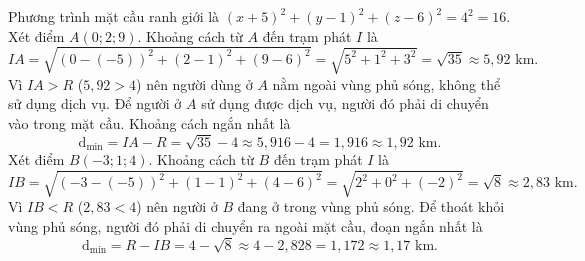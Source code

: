 \begin{ex}
{\begin{center}
		\end{center}
		\begin{itemchoice}
			\itemch Phương trình mặt cầu ranh giới là $(x+5)^2 + (y-1)^2 + (z-6)^2 = 4^2 = 16$.
			\itemch Xét điểm $A(0;2;9)$. Khoảng cách từ $A$ đến trạm phát $I$ là
			\[ IA = \sqrt{(0-(-5))^2 + (2-1)^2 + (9-6)^2} = \sqrt{5^2 + 1^2 + 3^2} = \sqrt{35} \approx 5{,}92 \text{ km}. \]
			Vì $IA > R$ ($5{,}92 > 4$) nên người dùng ở $A$ nằm ngoài vùng phủ sóng, không thể sử dụng dịch vụ.
			\itemch Để người ở $A$ sử dụng được dịch vụ, người đó phải di chuyển vào trong mặt cầu. Khoảng cách ngắn nhất là
			\[ \mathrm{d}_{\min} = IA - R = \sqrt{35} - 4 \approx 5{,}916 - 4 = 1{,}916 \approx 1{,}92 \text{ km}. \]
			\itemch Xét điểm $B(-3;1;4)$. Khoảng cách từ $B$ đến trạm phát $I$ là
			\[ IB = \sqrt{(-3-(-5))^2 + (1-1)^2 + (4-6)^2} = \sqrt{2^2 + 0^2 + (-2)^2} = \sqrt{8} \approx 2{,}83 \text{ km}. \]
			Vì $IB < R$ ($2{,}83 < 4$) nên người ở $B$ đang ở trong vùng phủ sóng.
			Để thoát khỏi vùng phủ sóng, người đó phải di chuyển ra ngoài mặt cầu, đoạn ngắn nhất là
			\[ \mathrm{d}_{\min} = R - IB = 4 - \sqrt{8} \approx 4 - 2{,}828 = 1{,}172 \approx 1{,}17 \text{ km}. \]
		\end{itemchoice}
	}
\end{ex}

